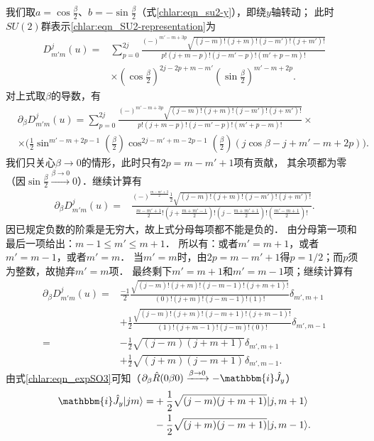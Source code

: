 我们取$a=\cos \frac{\beta}{2}$、$b=-\sin \frac{\beta}{2}$（式\eqref{chlar:eqn_su2-y}），即绕$y$轴转动；
此时$SU(2)$群表示\eqref{chlar:eqn_SU2-representation}为
\begin{align*}
    D^{j}_{m'm}(u) =&  \sum_{p=0}^{2j}  
    \frac{(-)^{m'-m+3p}  \sqrt{(j-m)! (j+m)! (j-m')! (j+m')!}   } 
    {p!(j+m-p)! (j-m'-p)! (m'+p-m)!} \\
    & \times \left(\cos \frac{\beta}{2}\right)^{2j-2p+m-m'} 
    \left(\sin \frac{\beta}{2}\right)^{m'-m+2p}.
\end{align*}
对上式取$\beta$的导数，有
\begin{align*}
    &\partial_\beta D^{j}_{m'm}(u) =  \sum_{p=0}^{2j}  
    \frac{(-)^{m'-m+3p}  \sqrt{(j-m)! (j+m)! (j-m')! (j+m')!}   } 
    {p!(j+m-p)! (j-m'-p)! (m'+p-m)!} \times \\
    & \times \biggl(\frac{1}{2} \sin ^{m'-m+2 p-1}\left(\frac{\beta }{2}\right) 
    \cos ^{2 j-m'+m-2 p-1}\left(\frac{\beta }{2}\right) \left(j \cos \beta -j+m'-m+2 p\right)\biggr).
\end{align*}
我们只关心$\beta\to 0$的情形，此时只有$2 p=m-m'+1$项有贡献，
其余项都为零（因$\sin\frac{\beta}{2} \xrightarrow{\beta \to 0}0$）．继续计算有
\begin{align*}
    \partial_\beta D^{j}_{m'm}(u) =&  \frac{(-)^{\frac{m-m'+3}{2}} \frac{1}{2} 
        \sqrt{(j-m)! (j+m)! (j-m')! (j+m')!}   } 
    {\frac{m-m'+1}{2}!(j+\frac{m+m'-1}{2})! (j-\frac{m+m'+1}{2})! (\frac{m'-m+1}{2})!} .
\end{align*}
因已规定负数的阶乘是无穷大，故上式分母每项都不能是负的．
由分母第一项和最后一项给出：$m-1\leqslant m' \leqslant m+1$．
所以有：或者$m'=m+1$，或者$m'=m-1$，或者$m'=m$．
当$m'=m$时，由$2 p=m-m'+1$得$p=1/2$；而$p$须为整数，故抛弃$m'=m$项．
最终剩下$m'=m+1$和$m'=m-1$项；继续计算有
\begin{align*}
    \partial_\beta D^{j}_{m'm}(u) =&  
    \frac{-1}{2}\frac{ \sqrt{(j-m)! (j+m)! (j-m-1)! (j+m+1)!}   } 
    {(0)!(j+m)! (j-m-1)! (1)!} \delta_{m',m+1}\\
    &+\frac{1}{2}\frac{ \sqrt{(j-m)! (j+m)! (j-m+1)! (j+m-1)!}   } 
    {(1)!(j+m-1)!(j-m)!(0)!} \delta_{m',m-1}\\
    =&-\frac{1}{2}\sqrt{(j-m)(j+m+1)}\delta_{m',m+1}\\
    &+\frac{1}{2}\sqrt{ (j+m) (j-m+1)}\delta_{m',m-1}.
\end{align*}
由式\eqref{chlar:eqn_expSO3}可知（$\partial_\beta \hat{R}(0\beta 0)\xrightarrow{\beta\to 0}-\mathbbm{i}\hat{J}_y$）
\begin{align}
    \mathbbm{i}\hat{J}_y|jm\rangle =&+ \frac{1}{2}\sqrt{(j-m)(j+m+1)}|j,m+1\rangle \notag \\
    &-\frac{1}{2}\sqrt{ (j+m) (j-m+1)} |j,m-1\rangle.
\end{align}
